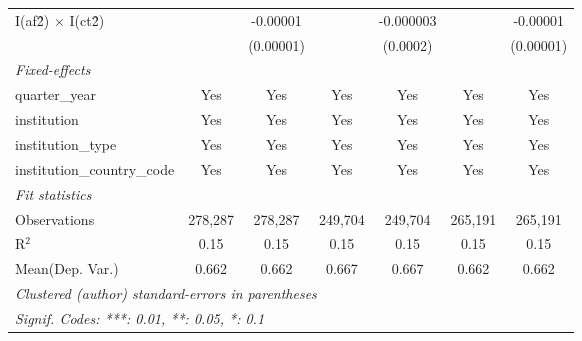 \begin{tabular}{lcccccc}
   I(af\^2) $\times$ I(ct\^2)         &               & -0.00001       &               & -0.000003      &               & -0.00001\\   
                                      &               & (0.00001)      &               & (0.0002)       &               & (0.00001)\\   
   \midrule
   \emph{Fixed-effects}\\
   quarter\_year                      & Yes           & Yes            & Yes           & Yes            & Yes           & Yes\\  
   institution                        & Yes           & Yes            & Yes           & Yes            & Yes           & Yes\\  
   institution\_type                  & Yes           & Yes            & Yes           & Yes            & Yes           & Yes\\  
   institution\_country\_code         & Yes           & Yes            & Yes           & Yes            & Yes           & Yes\\  
   \midrule
   \emph{Fit statistics}\\
   Observations                       & 278,287       & 278,287        & 249,704       & 249,704        & 265,191       & 265,191\\  
   R$^2$                              & 0.15          & 0.15           & 0.15          & 0.15           & 0.15          & 0.15\\  
Mean(Dep. Var.) & 0.662 & 0.662 & 0.667 & 0.667 & 0.662 & 0.662 \\
   \midrule \midrule
   \multicolumn{7}{l}{\emph{Clustered (author) standard-errors in parentheses}}\\
   \multicolumn{7}{l}{\emph{Signif. Codes: ***: 0.01, **: 0.05, *: 0.1}}\\
\end{tabular}
\par\endgroup

